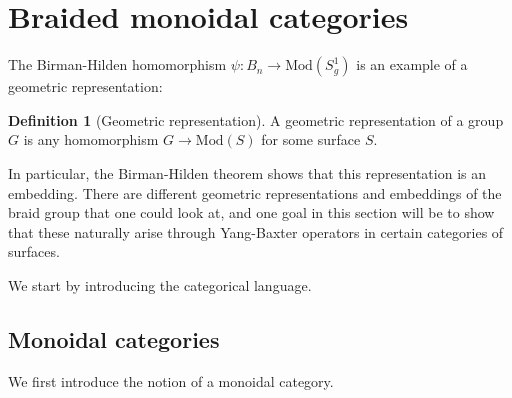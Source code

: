 \documentclass[reqno]{amsart}
\theoremstyle{definition}
\newtheorem{definition}[theorem]{Definition}
\theoremstyle{remark}
\newcommand{\Mod}{{\mathrm{Mod}}}
\begin{document}
   \section{Braided monoidal categories}

   The Birman-Hilden homomorphism
   $\psi \colon B_n \to \Mod \left( S_g^{1} \right) $
   is an example of a geometric
   representation:

\begin{definition}[Geometric representation]
    A geometric representation of a group $G$ is any
    homomorphism $G \to \Mod (S)$ for some
    surface $S$.
\end{definition}
In particular, the Birman-Hilden theorem shows that this
representation is an embedding. There are different
geometric representations and embeddings of the braid
group that one could look at, and one goal in this section will be
to show that these naturally arise through Yang-Baxter operators
in certain categories of surfaces. 

We start by introducing the categorical language.

   \subsection{Monoidal categories}

   We first introduce the notion of a monoidal category.
\end{document}
